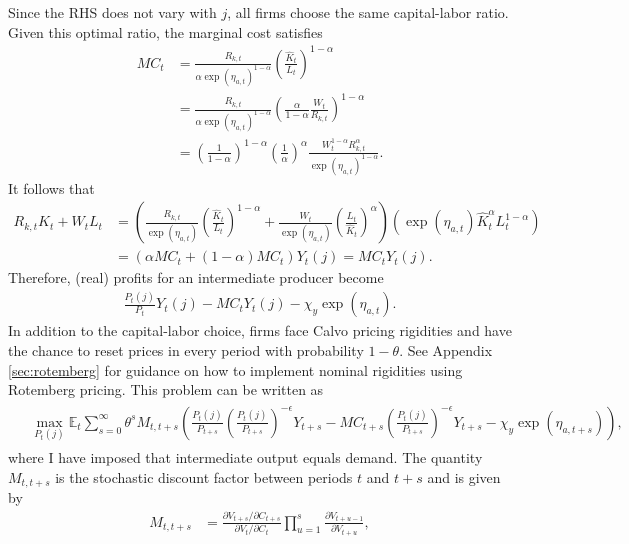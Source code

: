 \documentclass[12 pt, oneside]{article}
\theoremstyle{definition}
\theoremstyle{definition}
\theoremstyle{definition}
\newcommand{\E}{\mathbb{E}}
\begin{document}
Since the RHS does not vary with $j$, all firms choose the same capital-labor ratio. Given this optimal ratio, the marginal cost satisfies
\begin{align*}
  MC_t & = \frac{R_{k, t}}{\alpha \exp(\eta_{a, t})^{1 - \alpha}}\left(\frac{\hat{K}_t}{L_t}\right)^{1 - \alpha}\\
       & =  \frac{R_{k, t}}{\alpha \exp(\eta_{a, t})^{1 - \alpha}}\left(\frac{\alpha}{1 - \alpha} \frac{W_t}{R_{k, t}}\right)^{1 - \alpha}\\
       & =  \left(\frac{1}{1 - \alpha}\right)^{1 - \alpha}\left(\frac{1}{\alpha}\right)^{\alpha}\frac{W_t^{1 - \alpha}R_{k, t}^{\alpha}}{ \exp(\eta_{a, t})^{1 - \alpha}}.
\end{align*}
It follows that
\begin{align*}
  R_{k, t}\hat{K}_t + W_tL_t & = \left(\frac{R_{k, t}}{\exp(\eta_{a, t})}\left(\frac{\hat{K}_t}{L_t}\right)^{1 - \alpha} + \frac{W_t}{\exp(\eta_{a, t})}\left(\frac{L_t}{\hat{K}_t}\right)^{\alpha}\right)(\exp(\eta_{a, t})\hat{K}_t^\alpha L_t^{1 - \alpha})\\
                       & = \left(\alpha MC_t + (1 - \alpha)MC_t\right)Y_t(j) = MC_t Y_t(j).
\end{align*}
Therefore, (real) profits for an intermediate producer become
\begin{align}
  \frac{P_t(j)}{P_t}Y_t(j) - MC_t Y_t(j) - \chi_y \exp(\eta_{a, t}).
\end{align}
In addition to the capital-labor choice, firms face Calvo pricing rigidities and have the chance to reset prices in every period with probability $1 - \theta$. See Appendix \ref{sec:rotemberg} for guidance on how to implement nominal rigidities using Rotemberg pricing. This problem can be
written as
\begin{align}
  \begin{split}
  &\max_{P_t(j)} \E_t\sum_{s = 0}^\infty\theta^sM_{t, t + s}\left(\frac{P_t(j)}{P_{t + s}}\left(\frac{P_t(j)}{P_{t + s}}\right)^{-\epsilon}Y_{t + s} - MC_{t + s}\left(\frac{P_t(j)}{P_{t + s}}\right)^{-\epsilon}Y_{t + s} - \chi_y\exp(\eta_{a, t + s})\right),
  \end{split}
\end{align}
where I have imposed that intermediate output equals demand. The quantity $M_{t, t + s}$ is the stochastic discount factor between periods $t$ and $t + s$ and is given by
\begin{align}
  M_{t, t + s} & = \frac{\partial V_{t + s} / \partial C_{t + s}}{\partial V_t / \partial C_t} \prod_{u = 1}^s \frac{\partial V_{t + u - 1}}{\partial V_{t + u}},
\end{align}
\end{document}
